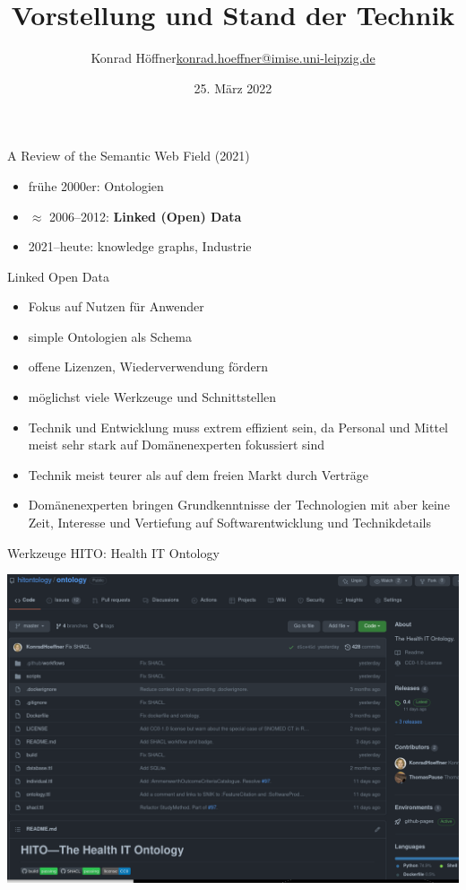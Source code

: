 \documentclass[14pt,aspectratio=1610]{beamer}
\date{25. März 2022}
\author{\texorpdfstring{Konrad Höffner\newline\url{konrad.hoeffner@imise.uni-leipzig.de}}{Konrad Höffner}}
\title{Vorstellung und Stand der Technik}
\subtitle{}
\begin{document}
\begin{frame}
\titlepage
\end{frame}

\begin{frame}{A Review of the Semantic Web Field (2021)}
\begin{itemize}
\item frühe 2000er: Ontologien
\item $\approx$ 2006--2012: \textbf{Linked (Open) Data}
\item 2021--heute: knowledge graphs, Industrie
\end{itemize}
\end{frame}

\begin{frame}{Linked Open Data}
\begin{itemize}
\item Fokus auf Nutzen für Anwender
\item simple Ontologien als Schema
\item offene Lizenzen, Wiederverwendung fördern
\item möglichst viele Werkzeuge und Schnittstellen
\item Technik und Entwicklung muss extrem effizient sein, da Personal und Mittel meist sehr stark auf Domänenexperten fokussiert sind
\item Technik meist teurer als auf dem freien Markt durch Verträge
\item Domänenexperten bringen Grundkenntnisse der Technologien mit aber keine Zeit, Interesse und Vertiefung auf Softwarentwicklung und Technikdetails
\end{itemize}
\end{frame}

\begin{frame}{Werkzeuge HITO: Health IT Ontology}
\end{frame}

\begin{frame}{}
\centering\includegraphics[width=1.05\textwidth,height=1.05\textheight,keepaspectratio]{img/github.png}
\end{frame}
\end{document}
